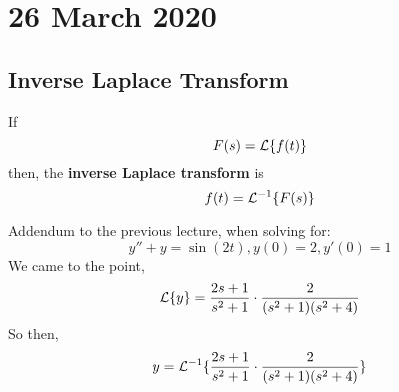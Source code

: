 \documentclass[diffeq.tex]{subfiles}
\begin{document}
\chapter{26 March 2020}
    \section{Inverse Laplace Transform}
    \begin{definition}
        If
        \begin{equation}
            F(s) = \mathcal{L}\{f(t)\}
        \end{equation}
        then, the \textbf{inverse Laplace transform} is
        \begin{equation}
            f(t) = \mathcal{L}^{-1}\{F(s)\}
        \end{equation}
    \end{definition}
    Addendum to the previous lecture, when solving for:
    \begin{equation}
        y'' + y = \sin(2t), y(0) = 2, y'(0) = 1
    \end{equation}
    We came to the point,
    \begin{equation}
        \mathcal{L}\{y\} = \frac{2s + 1}{s^{2} + 1}\cdot\frac{2}{(s^{2} + 1)(s^{2} + 4)}
    \end{equation}
    So then,
    \begin{equation}
        y = \mathcal{L}^{-1}\{\frac{2s + 1}{s^{2} + 1}\cdot\frac{2}{(s^{2} + 1)(s^{2} + 4)}\}
    \end{equation}
\end{document}
